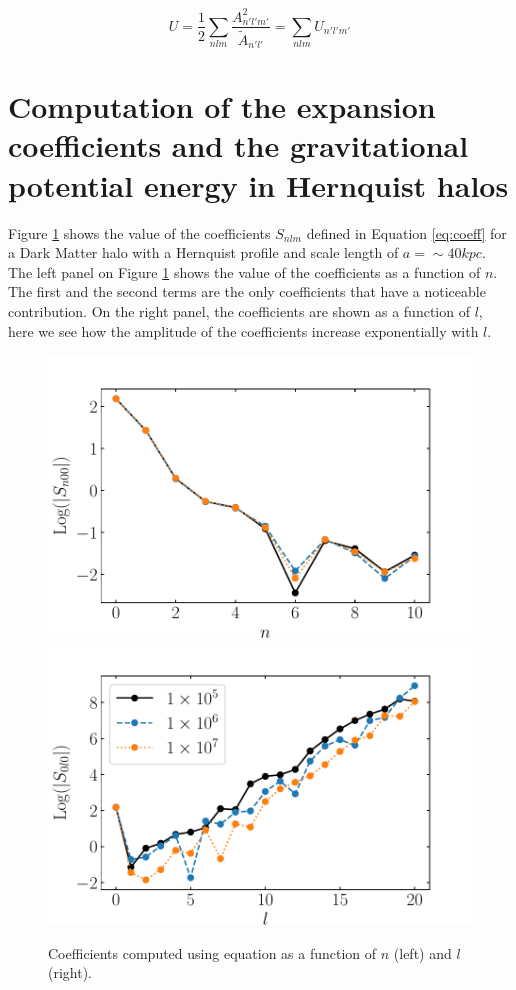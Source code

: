\documentclass[14pt]{article}
\begin{document}
\begin{equation}
  U = \dfrac{1}{2}\sum_{nlm} \frac{A_{n'l'm'}^2}{\tilde{A}_{n'l'}} = \sum_{nlm} U_{n'l'm'}
\end{equation}


\section{Computation of the expansion coefficients and the gravitational
potential energy in Hernquist halos}

Figure \ref{fig:coeff_hernquist} shows the value of the coefficients $S_{nlm}$
defined in Equation \ref{eq:coeff} for a Dark
Matter halo with a Hernquist profile and scale length of $a=\sim 40 kpc$. The left
panel on Figure \ref{fig:coeff_hernquist} shows the value of the
coefficients as a function of $n$. The first and the second terms are the
only coefficients that have a noticeable contribution. On the right panel, the
coefficients are shown as a function of $l$, here we see how the amplitude of
the coefficients increase exponentially with $l$. 

\begin{figure}[H]
  \centering
  \includegraphics[scale=0.5]{../code/S_n_henrquist.pdf}
  \includegraphics[scale=0.5]{../code/S_l_henrquist.pdf}
  \caption{Coefficients computed using equation \label{eq:coeff} as a function
  of $n$ (left) and $l$ (right).} \label{fig:coeff_hernquist}
\end{figure}
\end{document}
